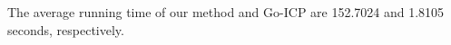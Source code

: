 \documentclass[11pt,bezier,]{article}
\begin{document}
The average running time of our method and Go-ICP are 152.7024 and %
    1.8105 seconds, respectively.

% 
% 
% 
\end{document}
